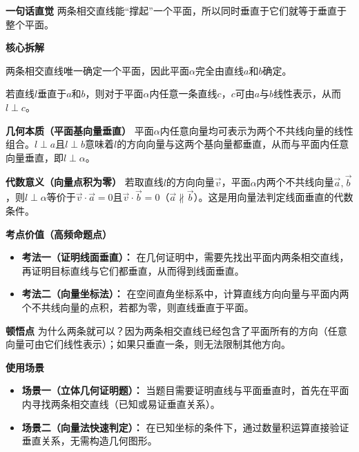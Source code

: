 \begin{explanationbox}
	\textbf{\textcolor{CExplanation}{一句话直觉}}
	两条相交直线能“撑起”一个平面，所以同时垂直于它们就等于垂直于整个平面。

	\medskip
	\textbf{\textcolor{CExplanation}{核心拆解}}
	\begin{description}[style=nextline, leftmargin=2.8em, labelsep=0.5em, itemsep=0.45em]
		\item[\textbf{要点一（相交线定平面）：}]
			两条相交直线唯一确定一个平面，因此平面$\alpha$完全由直线$a$和$b$确定。
		\item[\textbf{要点二（垂直传递性）：}]
			若直线$l$垂直于$a$和$b$，则对于平面$\alpha$内任意一条直线$c$，$c$可由$a$与$b$线性表示，从而$l\perp c$。
	\end{description}

	\medskip
	\textbf{\textcolor{CExplanation}{几何本质（平面基向量垂直）}}
	平面$\alpha$内任意向量均可表示为两个不共线向量的线性组合。$l\perp a$且$l\perp b$意味着$l$的方向向量与这两个基向量都垂直，从而与平面内任意向量垂直，即$l\perp\alpha$。

	\medskip
	\textbf{\textcolor{CExplanation}{代数意义（向量点积为零）}}
	若取直线$l$的方向向量$\vec{v}$，平面$\alpha$内两个不共线向量$\vec{a},\vec{b}$，则$l\perp\alpha$等价于$\vec{v}\cdot\vec{a}=0$且$\vec{v}\cdot\vec{b}=0$（$\vec{a}\not\parallel\vec{b}$）。这是用向量法判定线面垂直的代数条件。

	\medskip
	\textbf{\textcolor{CExplanation}{考点价值（高频命题点）}}
	\begin{itemize}[leftmargin=*, itemsep=0.5em, topsep=0.4em]
		\item \textbf{考法一（证明线面垂直）：} 在几何证明中，需要先找出平面内两条相交直线，再证明目标直线与它们都垂直，从而得到线面垂直。
		\item \textbf{考法二（向量坐标法）：} 在空间直角坐标系中，计算直线方向向量与平面内两个不共线向量的点积，若都为零，则直线垂直于平面。
	\end{itemize}

	\medskip
	\textbf{\textcolor{CExplanation}{顿悟点}}
	为什么两条就可以？因为两条相交直线已经包含了平面所有的方向（任意向量可由它们线性表示）；如果只垂直一条，则无法限制其他方向。

	\medskip
	\textbf{\textcolor{CExplanation}{使用场景}}
	\begin{itemize}[leftmargin=*, itemsep=0.5em, topsep=0.4em]
		\item \textbf{场景一（立体几何证明题）：} 当题目需要证明直线与平面垂直时，首先在平面内寻找两条相交直线（已知或易证垂直关系）。
		\item \textbf{场景二（向量法快速判定）：} 在已知坐标的条件下，通过数量积运算直接验证垂直关系，无需构造几何图形。
	\end{itemize}

\end{explanationbox}
